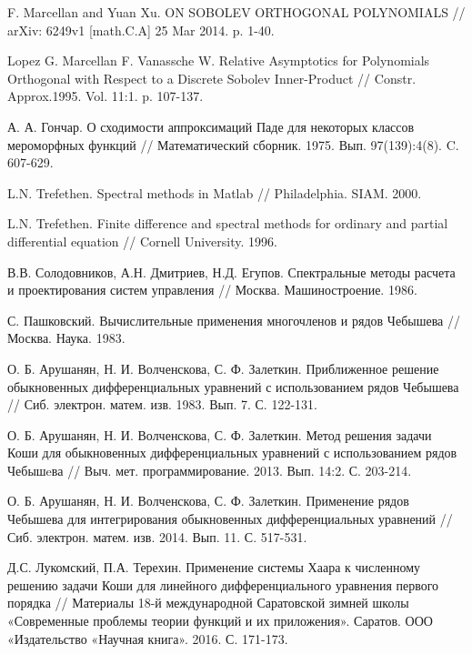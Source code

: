 \begin{thebibliography}{999}
 F. Marcellan and Yuan Xu. ON SOBOLEV ORTHOGONAL POLYNOMIALS // arXiv: 6249v1 [math.C.A] 25 Mar 2014. p. 1-40.


 Lopez G. Marcellan F. Vanassche W. Relative Asymptotics for Polynomials Orthogonal with Respect to a Discrete Sobolev Inner-Product // Constr. Approx.1995. Vol. 11:1. p. 107-137.


 А. А. Гончар. О сходимости аппроксимаций Паде для некоторых классов мероморфных функций // Математический сборник. 1975. Вып. 97(139):4(8). C. 607-629.


 L.N. Trefethen. Spectral methods in Matlab // Philadelphia. SIAM. 2000.


 L.N. Trefethen. Finite difference and spectral methods for ordinary and partial differential equation // Cornell University. 1996.


 В.В. Солодовников, А.Н. Дмитриев, Н.Д. Егупов. Спектральные методы расчета и проектирования систем управления // Москва. Машиностроение. 1986.


 С. Пашковский. Вычислительные применения многочленов и рядов Чебышева // Москва. Наука. 1983.


 О. Б. Арушанян, Н. И. Волченскова, С. Ф. Залеткин. Приближенное решение обыкновенных дифференциальных уравнений с использованием рядов Чебышева // Сиб. электрон. матем. изв. 1983. Вып. 7. С. 122-131.


 О. Б. Арушанян, Н. И. Волченскова, С. Ф. Залеткин. Метод решения задачи Коши для обыкновенных дифференциальных уравнений с использованием рядов Чебышeва // Выч. мет. программирование. 2013. Вып. 14:2. С. 203-214.


 О. Б. Арушанян, Н. И. Волченскова, С. Ф. Залеткин. Применение рядов Чебышева для интегрирования обыкновенных дифференциальных уравнений // Сиб. электрон. матем. изв. 2014. Вып. 11. С. 517-531.


 Д.С. Лукомский, П.А. Терехин. Применение системы Хаара к численному решению задачи Коши для линейного дифференциального уравнения первого порядка // Материалы 18-й международной Саратовской зимней школы «Современные проблемы теории функций и их приложения». Саратов. ООО «Издательство «Научная книга». 2016. С. 171-173.



\end{thebibliography}
